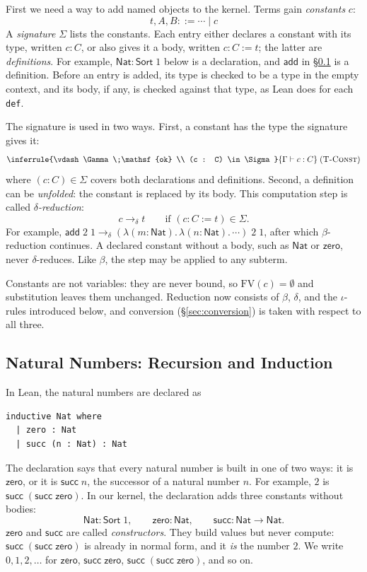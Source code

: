 \documentclass[acmsmall,screen,nonacm]{acmart}
\newcommand{\Sort}[1]{\mathsf{Sort}\;#1}
\newcommand{\tLam}[3]{\lambda(#1{:}#2).\,#3}
\newcommand{\FV}{\mathrm{FV}}
\newcommand{\ctxok}[1]{\vdash #1\;\mathsf{ok}}
\newcommand{\rulename}[1]{\;(\textsc{#1})}
\newcommand{\Nat}{\mathsf{Nat}}
\newcommand{\zero}{\mathsf{zero}}
\newcommand{\tsucc}{\mathsf{succ}}
\newcommand{\add}{\mathsf{add}}
\newcommand{\deltared}{\to_{\delta}}
\begin{document}
First we need a way to add named objects to the kernel.
Terms gain \emph{constants} $c$:
\[
t, A, B ::= \cdots \mid c
\]
A \emph{signature} $\Sigma$ lists the constants.
Each entry either declares a constant with its type, written $c : C$, or also gives it a body, written $c : C \mathrel{:=} t$; the latter are \emph{definitions}.
For example, $\Nat : \Sort{1}$ below is a declaration, and $\add$ in \S\ref{sec:nat} is a definition.
Before an entry is added, its type is checked to be a type in the empty context, and its body, if any, is checked against that type, as Lean does for each \texttt{def}.

The signature is used in two ways.
First, a constant has the type the signature gives it:
\[
\inferrule{\ctxok{\Gamma} \\ (c : C) \in \Sigma}{\Gamma \vdash c : C}\rulename{T-Const}
\]
where $(c : C) \in \Sigma$ covers both declarations and definitions.
Second, a definition can be \emph{unfolded}: the constant is replaced by its body.
This computation step is called \emph{$\delta$-reduction}:
\[
c \deltared t \qquad \text{if } (c : C \mathrel{:=} t) \in \Sigma.
\]
For example, $\add\;2\;1 \deltared (\tLam{m}{\Nat}{\tLam{n}{\Nat}{\cdots}})\;2\;1$, after which $\beta$-reduction continues.
A declared constant without a body, such as $\Nat$ or $\zero$, never $\delta$-reduces.
Like $\beta$, the step may be applied to any subterm.

Constants are not variables: they are never bound, so $\FV(c) = \emptyset$ and substitution leaves them unchanged.
Reduction now consists of $\beta$, $\delta$, and the $\iota$-rules introduced below, and conversion (\S\ref{sec:conversion}) is taken with respect to all three.

\subsection{Natural Numbers: Recursion and Induction}
\label{sec:nat}

In Lean, the natural numbers are declared as
\begin{lstlisting}[numbers=none, columns=fullflexible, keepspaces=true]
inductive Nat where
  | zero : Nat
  | succ (n : Nat) : Nat
\end{lstlisting}
The declaration says that every natural number is built in one of two ways: it is $\zero$, or it is $\tsucc\;n$, the successor of a natural number $n$.
For example, $2$ is $\tsucc\;(\tsucc\;\zero)$.
In our kernel, the declaration adds three constants without bodies:
\[
\Nat : \Sort{1}, \qquad \zero : \Nat, \qquad \tsucc : \Nat \to \Nat.
\]
$\zero$ and $\tsucc$ are called \emph{constructors}.
They build values but never compute: $\tsucc\;(\tsucc\;\zero)$ is already in normal form, and it \emph{is} the number $2$.
We write $0, 1, 2, \ldots$ for $\zero$, $\tsucc\;\zero$, $\tsucc\;(\tsucc\;\zero)$, and so on.
\end{document}
